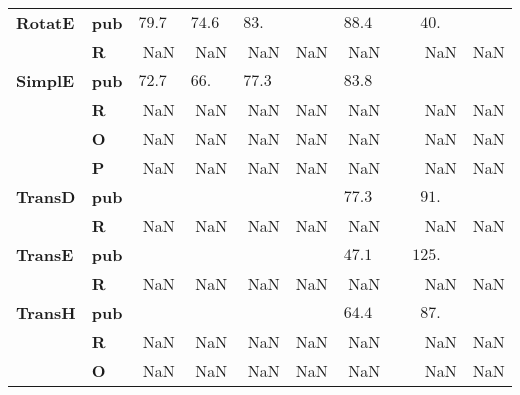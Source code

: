 \begin{tabular}{llrrrrrrr}
\textbf{RotatE} & \textbf{pub} &  $79.7\phantom{0}$ &  $74.6\phantom{0}$ &  $83.\phantom{00}$ &             &  $88.4\phantom{0}$ &  $\phantom{000}40.\phantom{00}$ &          \\
       & \textbf{R} &                NaN &                NaN &                NaN &         NaN &                NaN &                             NaN &      NaN \\\midrule
\textbf{SimplE} & \textbf{pub} &  $72.7\phantom{0}$ &  $66.\phantom{00}$ &  $77.3\phantom{0}$ &             &  $83.8\phantom{0}$ &                                 &          \\
       & \textbf{R} &                NaN &                NaN &                NaN &         NaN &                NaN &                             NaN &      NaN \\
       & \textbf{O} &                NaN &                NaN &                NaN &         NaN &                NaN &                             NaN &      NaN \\
       & \textbf{P} &                NaN &                NaN &                NaN &         NaN &                NaN &                             NaN &      NaN \\\midrule
\textbf{TransD} & \textbf{pub} &                    &                    &                    &             &  $77.3\phantom{0}$ &  $\phantom{000}91.\phantom{00}$ &          \\
       & \textbf{R} &                NaN &                NaN &                NaN &         NaN &                NaN &                             NaN &      NaN \\\midrule
\textbf{TransE} & \textbf{pub} &                    &                    &                    &             &  $47.1\phantom{0}$ &  $\phantom{00}125.\phantom{00}$ &          \\
       & \textbf{R} &                NaN &                NaN &                NaN &         NaN &                NaN &                             NaN &      NaN \\\midrule
\textbf{TransH} & \textbf{pub} &                    &                    &                    &             &  $64.4\phantom{0}$ &  $\phantom{000}87.\phantom{00}$ &          \\
       & \textbf{R} &                NaN &                NaN &                NaN &         NaN &                NaN &                             NaN &      NaN \\
       & \textbf{O} &                NaN &                NaN &                NaN &         NaN &                NaN &                             NaN &      NaN \\

\end{tabular}

